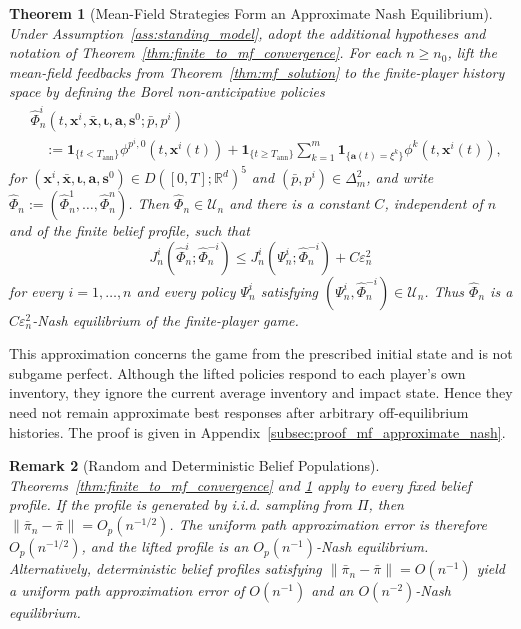 \documentclass[12pt]{article}
\numberwithin{equation}{section}
\newtheorem{theorem}{Theorem}[section]
\newtheorem{remark}[theorem]{Remark}
\theoremstyle{definition}
\begin{document}
\begin{theorem}[Mean-Field Strategies Form an Approximate Nash Equilibrium]
\label{thm:mf_approximate_nash}
Under Assumption~\ref{ass:standing_model}, adopt the additional hypotheses and
notation of Theorem~\ref{thm:finite_to_mf_convergence}.
For each \(n\ge n_0\), lift the mean-field feedbacks from
Theorem~\ref{thm:mf_solution} to the finite-player history space by defining
the Borel non-anticipative policies
\begin{equation}\label{eq:mf_lifted_finite_profile}
\begin{aligned}
&\widehat\Phi_n^i
(t,\mathbf{x}^i,\bar{\mathbf{x}},\boldsymbol{\iota},\mathbf{a},\mathbf{s}^0;\bar p,p^i)
\\
&\quad:=
\mathbf 1_{\{t<T_{\mathrm{ann}}\}}
\phi^{p^i,0}(t,\mathbf{x}^i(t))
+
\mathbf 1_{\{t\geq T_{\mathrm{ann}}\}}
\sum_{k=1}^m
\mathbf 1_{\{\mathbf{a}(t)=\xi^k\}}
\phi^{k}(t,\mathbf{x}^i(t)),
\end{aligned}
\end{equation}
for \((\mathbf{x}^i,\bar{\mathbf{x}},\boldsymbol{\iota},\mathbf{a},\mathbf{s}^0)
\in D([0,T];\mathbb R^d)^5\) and
\((\bar p,p^i)\in\Delta_m^2\), and write
\(\widehat\Phi_n
:=(\widehat\Phi_n^1,\ldots,\widehat\Phi_n^n)\).
Then \(\widehat\Phi_n\in\mathcal U_n\) and there is a constant \(C\),
independent of \(n\) and of the finite belief profile, such that
\begin{equation}\label{eq:mf_profile_approximate_nash}
J_n^i(
\widehat\Phi_n^i;\widehat\Phi_n^{-i}
)
\leq
J_n^i(
\Psi_n^i;\widehat\Phi_n^{-i}
)
+
C\varepsilon_n^2
\end{equation}
for every \(i=1,\ldots,n\) and every policy \(\Psi_n^i\) satisfying
\((\Psi_n^i,\widehat\Phi_n^{-i})\in\mathcal U_n\). Thus
\(\widehat\Phi_n\) is a \(C\varepsilon_n^2\)-Nash equilibrium of the finite-player
game.
\end{theorem}

This approximation concerns the game from the prescribed initial state and is
not subgame perfect. Although the lifted policies respond to each player's own
inventory, they ignore the current average inventory and impact state. Hence
they need not remain approximate best responses after arbitrary off-equilibrium
histories.
The proof is given in
Appendix~\ref{subsec:proof_mf_approximate_nash}.

\begin{remark}[Random and Deterministic Belief Populations]\label{rem:mf_iid_beliefs}
Theorems~\ref{thm:finite_to_mf_convergence} and
\ref{thm:mf_approximate_nash} apply to every fixed belief profile.
If the profile is generated by i.i.d. sampling from \(\Pi\), then
\(\|\bar\pi_n-\bar\pi\|=O_p(n^{-1/2})\). The uniform path approximation
error is therefore \(O_p(n^{-1/2})\), and the lifted profile is an
\(O_p(n^{-1})\)-Nash equilibrium.
Alternatively, deterministic belief profiles satisfying
\(\|\bar\pi_n-\bar\pi\|=O(n^{-1})\) yield a uniform path approximation
error of \(O(n^{-1})\) and an \(O(n^{-2})\)-Nash equilibrium.
\end{remark}
\end{document}
